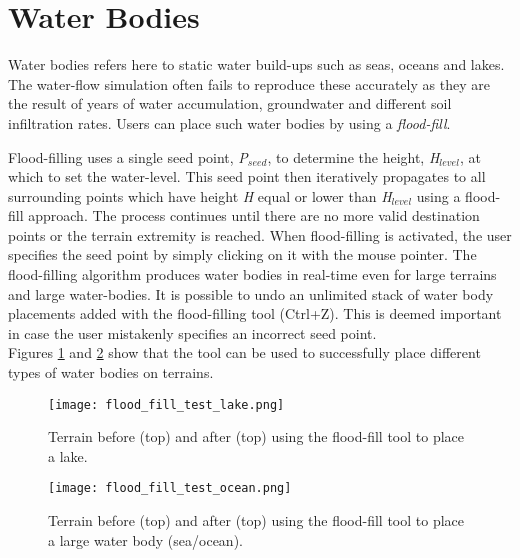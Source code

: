 \section{Water Bodies}

Water bodies refers here to static water build-ups such as seas, oceans and lakes. The water-flow simulation \label{sec:rivers_and_streams} often fails to reproduce these accurately as they are the result of years of water accumulation, groundwater and different soil infiltration rates. Users can place such water bodies by using a \textit{flood-fill}.

Flood-filling uses a single seed point, \textit{P$_{seed}$}, to determine the height, \textit{H$_{level}$}, at which to set the water-level. This seed point then iteratively propagates to all surrounding points which have height \textit{H} equal or lower than \textit{H$_{level}$} using a flood-fill approach. The process continues until there are no more valid destination points or the terrain extremity is reached. When flood-filling is activated, the user specifies the seed point by simply clicking on it with the mouse pointer. The flood-filling algorithm produces water bodies in real-time even for large terrains and large water-bodies. It is possible to undo an unlimited stack of water body placements added with the flood-filling tool (Ctrl+Z). This is deemed important in case the user mistakenly specifies an incorrect seed point. \\

Figures \ref{fig:flood_fill_lake} and \ref{fig:flood_fill_test_ocean} show that the tool can be used to successfully place different types of water bodies on terrains.

\begin{figure}
\center
	\texttt{[image: flood\_fill\_test\_lake.png]}
	\caption{ Terrain before (top) and after (top) using the flood-fill tool to place a lake. }	
	\label{fig:flood_fill_lake}
\end{figure}

\begin{figure}
\center
	\texttt{[image: flood\_fill\_test\_ocean.png]}
	\caption{ Terrain before (top) and after (top) using the flood-fill tool to place a large water body (sea/ocean). }	
	\label{fig:flood_fill_test_ocean}
\end{figure}
